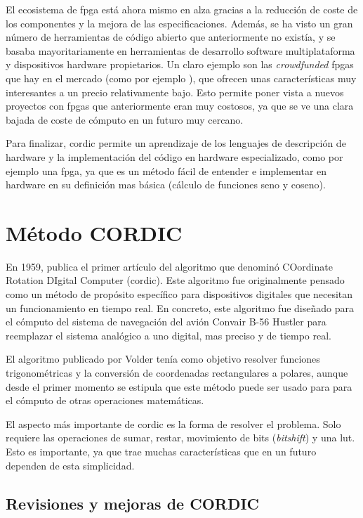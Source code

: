El ecosistema de \gls{fpga} está ahora mismo en alza gracias a la reducción de coste de los componentes y la mejora de las especificaciones. Además, se ha visto un gran número de herramientas de código abierto que anteriormente no existía, y se basaba mayoritariamente en herramientas de desarrollo software multiplataforma y dispositivos hardware propietarios. Un claro ejemplo son las \textit{crowdfunded} \gls{fpga}s que hay en el mercado (como por ejemplo \cite{noauthor_ulx3s_nodate}), que ofrecen unas características muy interesantes a un precio relativamente bajo. Esto permite poner vista a nuevos proyectos con \gls{fpga}s que anteriormente eran muy costosos, ya que se ve una clara bajada de coste de cómputo en un futuro muy cercano.

Para finalizar, \gls{cordic} permite un aprendizaje de los lenguajes de descripción de hardware y la implementación del código en hardware especializado, como por ejemplo una \gls{fpga}, ya que es un método fácil de entender e implementar en hardware en su definición mas básica (cálculo de funciones seno y coseno).

\section{Método CORDIC}

En 1959, \citeauthor{volder_cordic_1959} publica el primer artículo del algoritmo que denominó COordinate Rotation DIgital Computer (\gls{cordic}). Este algoritmo fue originalmente pensado como un método de propósito específico para dispositivos digitales que necesitan un funcionamiento en tiempo real. En concreto, este algoritmo fue diseñado para el cómputo del sistema de navegación del avión Convair B-56 Hustler para reemplazar el sistema analógico a uno digital, mas preciso y de tiempo real. 

El algoritmo publicado por Volder tenía como objetivo resolver funciones trigonométricas y la conversión de coordenadas rectangulares a polares, aunque desde el primer momento se estipula que este método puede ser usado para para el cómputo de otras operaciones matemáticas.

El aspecto más importante de \gls{cordic} es la forma de resolver el problema. Solo requiere las operaciones de sumar, restar, movimiento de bits (\textit{bitshift}) y una \gls{lut}. Esto es importante, ya que trae muchas características que en un futuro dependen de esta simplicidad.


\subsection{Revisiones y mejoras de CORDIC}

